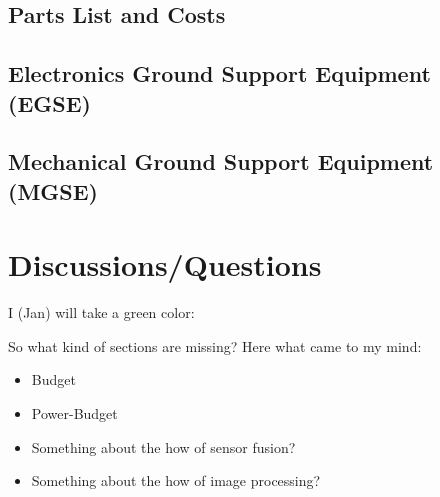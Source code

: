 \documentclass[fontsize=11pt,paper=a4,]{scrartcl}
\begin{document}
\subsection{Parts List and Costs}
\subsection{Electronics Ground Support Equipment (EGSE)}
\subsection{Mechanical Ground Support Equipment (MGSE)}


\section{Discussions/Questions}

I (Jan) will take {\color{green} a green color}:

{\color{green} So what kind of sections are missing? Here what came to my mind:
\begin{itemize}
 \item Budget
 \item Power-Budget
 \item Something about the how of sensor fusion?
 \item Something about the how of image processing?
\end{itemize}
}


\newpage
\printbibliography
{}
\pagestyle{plain}
\end{document}
